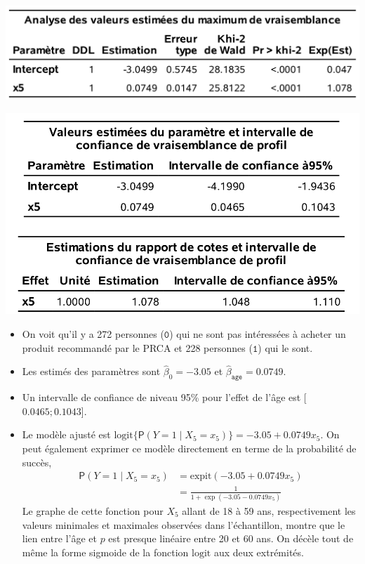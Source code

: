 \documentclass[
  11pt,
  letterpaper,
]{book}
\providecommand{\tightlist}{%
  \setlength{\itemsep}{0pt}\setlength{\parskip}{0pt}}
\theoremstyle{definition}
\theoremstyle{definition}
\theoremstyle{definition}
\theoremstyle{definition}
\theoremstyle{remark}
\begin{document}
\begin{center}\includegraphics[width=0.8\linewidth]{figures/03-logistic-e3} \end{center}

\begin{center}\includegraphics[width=0.8\linewidth]{figures/03-logistic-e4} \end{center}

\begin{itemize}
\tightlist
\item
  On voit qu'il y a 272 personnes (\(\texttt{0}\)) qui ne sont pas intéressées à acheter un produit recommandé par le PRCA et 228 personnes (\(\texttt{1}\)) qui le sont.
\item
  Les estimés des paramètres sont \(\widehat{\beta}_0 = -3.05\) et \(\widehat{\beta}_{\texttt{age}}=0.0749\).
\item
  Un intervalle de confiance de niveau 95\% pour l'effet de l'âge est {[}\(0.0465; 0.1043\){]}.
\item
  Le modèle ajusté est \(\mathrm{logit}\{{\mathsf P}\left(Y=1 \mid X_5=x_5\right)\} = -3.05 + 0.0749 x_5\). On peut également exprimer ce modèle directement en terme de la probabilité de succès,
  \begin{align*}
  {\mathsf P}\left(Y=1 \mid X_5=x_5\right) &= \mathrm{expit}(-3.05 + 0.0749 x_5) \\&= \frac{1}{1+\exp(-3.05 - 0.0749 x_5)}
  \end{align*}
  Le graphe de cette fonction pour \(X_5\) allant de 18 à 59 ans, respectivement les valeurs minimales et maximales observées dans l'échantillon, montre que le lien entre l'âge et \(p\) est presque linéaire entre 20 et 60 ans. On décèle tout de même la forme sigmoide de la fonction \(\mathrm{logit}\) aux deux extrémités.
\end{itemize}
\end{document}
